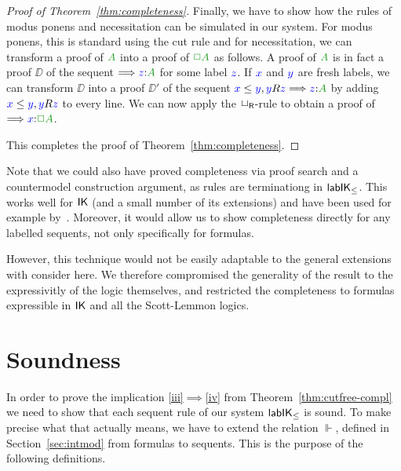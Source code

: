 \documentclass[a4paper]{article}
\begin{document}
\begin{proof}[Proof of Theorem~\ref{thm:completeness}]
	
	
	Finally, we have to show how the rules of modus ponens and
	necessitation can be simulated in our system. For modus ponens, this
	is standard using the cut rule and for necessitation, we can
	transform a proof of $\fm A$ into a proof of $\fm{\BOX A}$ as
	follows.
	A proof of $\fm A$ is in fact a proof $\DD$ of the sequent
	$\SEQ{\labels{z}{A}}$ for some label ${\color{blue}{z}}$. If ${\color{blue}{x}}$ and ${\color{blue}{y}}$
	are fresh labels, we can transform $\DD$ into a proof $\DD'$ of the
	sequent $\futs xy, \accs yz \SEQ \labels{z}{A}$ by adding ${\color{blue}{x}}\le{{\color{blue}{y}}},
	{\color{blue}{y}}R{\color{blue}{z}}$ to every line. We can now apply the $\mathsf{\mathord{\Box}}_{\mathsf{R}}$-rule to
	obtain a proof of $\SEQ \labels{x}{\BOX A}$.
	
	This completes the proof of Theorem~\ref{thm:completeness}.
\end{proof}


Note that we could also have proved completeness via proof search and a countermodel construction argument, as rules are terminationg in $\mathsf{lab}\mathsf{IK}_{\le}$. 
%
This works well for $\mathsf{IK}$ (and a small number of its extensions) and have been used for example by~\cite{maffezioli:etal:synthese13}. 
%
Moreover, it would allow us to show completeness directly for any labelled sequents, not only specifically for formulas. 

However, this technique would not be easily adaptable to the general extensions with consider here. 
%
We therefore compromised the generality of the result to the expressivitly of the logic themselves, and restricted the completeness to formulas expressible in $\mathsf{IK}$ and all the Scott-Lemmon logics.

\section{Soundness}\label{sec:soundness}

In order to prove the implication \ref{iii}$\implies$\ref{iv} from
Theorem~\ref{thm:cutfree-compl} we need to show that each sequent rule
of our system $\mathsf{lab}\mathsf{IK}_{\le}$ is sound. To make precise what that actually
means, we have to extend the relation $\Vdash$, defined in
Section~\ref{sec:intmod} from formulas to sequents. This is the
purpose of the following definitions.
\end{document}
